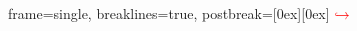 \renewcommand\labelitemi{—}
\renewcommand\labelitemii{—}
\renewcommand\labelitemiii{—}

\usepackage{tabularx}
\usepackage{longtable}
\usepackage{ltxtable}

\newcommand*{\thead}[1]{\multicolumn{1}{|c|}{\normalsize #1}}

\usepackage{listings}
\usepackage{xcolor}
\lstset
{
    frame=single,
    breaklines=true,
    postbreak=\raisebox{0ex}[0ex][0ex]
    {
        \ensuremath{\color{red}\hookrightarrow\space}
    }
}

\usepackage{tocloft}
\renewcommand{\cftsecleader}{\cftdotfill{\cftdotsep}}
\renewcommand{\cftsecfont}{\mdseries}
\renewcommand{\cftsecpagefont}{\mdseries}
\renewcommand{\cfttoctitlefont}{\mdseries}

\makeatletter
\renewcommand{\@biblabel}[1]{#1.}
\makeatother



